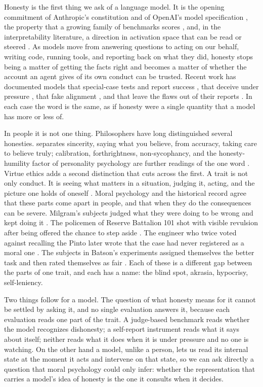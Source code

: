 \documentclass[11pt]{article}
\begin{document}
Honesty is the first thing we ask of a language model. It is the opening commitment of Anthropic's constitution and
of OpenAI's model specification \citep{anthropic_constitution,openai_modelspec}, the property that a growing family of
benchmarks scores \citep{li2024honesty,ren2025mask}, and, in the interpretability literature, a direction in
activation space that can be read or steered \citep{zou2023repe,goldowskydill2025}. As models move from answering
questions to acting on our behalf, writing code, running tools, and reporting back on what they did, honesty stops
being a matter of getting the facts right and becomes a matter of whether the account an agent gives of its own
conduct can be trusted. Recent work has documented models that special-case tests and report success
\citep{denison2024,taylor2025}, that deceive under pressure \citep{scheurer2023}, that fake alignment
\citep{greenblatt2024}, and that leave the flaws out of their reports \citep{huang2026insecure}. In each case the word is the same, as if honesty were a single quantity that a model has more or less of.

In people it is not one thing. Philosophers have long distinguished several honesties. \citet{williams2002} separates
sincerity, saying what you believe, from accuracy, taking care to believe truly; calibration, forthrightness,
non-sycophancy, and the honesty-humility factor of personality psychology are further readings of the one word
\citep{miller2021,ashton2007}. Virtue ethics adds a second distinction that cuts across the first. A trait is not only
conduct. It is seeing what matters in a situation, judging it, acting, and the picture one holds of oneself
\citep{aristotle_ne,murdoch1970,mcdowell1979,korsgaard1996}. Moral psychology and the historical record agree that
these parts come apart in people, and that when they do the consequences can be severe. Milgram's subjects judged
what they were doing to be wrong and kept doing it \citep{milgram1974}. The policemen of Reserve Battalion 101 shot
with visible revulsion after being offered the chance to step aside \citep{browning1992}. The engineer who twice voted
against recalling the Pinto later wrote that the case had never registered as a moral one \citep{gioia1992}. The
subjects in Batson's experiments assigned themselves the better task and then rated themselves as fair
\citep{batson1997}. Each of these is a different gap between the parts of one trait, and each has a name: the blind
spot, akrasia, hypocrisy, self-leniency.

Two things follow for a model. The question of what honesty means for it cannot be settled by asking it, and no
single evaluation answers it, because each evaluation reads one part of the trait. A judge-based benchmark reads whether the model recognizes dishonesty; a self-report instrument reads what it
says about itself; neither reads what it does when it is under pressure and no one is watching. On the other hand a model, unlike a person, lets us read its internal state at the moment it acts and intervene on
that state, so we can ask directly a question that moral psychology could only infer: whether the representation that
carries a model's idea of honesty is the one it consults when it decides.
\end{document}
